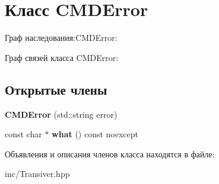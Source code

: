 \hypertarget{classCMDError}{}\section{Класс C\+M\+D\+Error}
\label{classCMDError}


Граф наследования\+:C\+M\+D\+Error\+:


Граф связей класса C\+M\+D\+Error\+:
\subsection*{Открытые члены}
\begin{DoxyCompactItemize}
\item 
\mbox{\label{classCMDError_a97a52d66d2501be11c1d93747acdfb80}} 
{\bfseries C\+M\+D\+Error} (std\+::string error)
\item 
\mbox{\label{classCMDError_a8481eb6c8741266c2ad9dc43d3cd012e}} 
const char $\ast$ {\bfseries what} () const noexcept
\end{DoxyCompactItemize}


Объявления и описания членов класса находятся в файле\+:\begin{DoxyCompactItemize}
\item 
inc/Transiver.\+hpp\end{DoxyCompactItemize}
